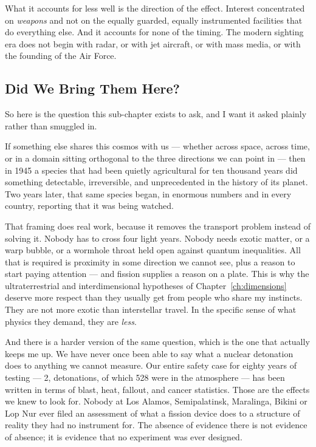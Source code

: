 What it accounts for less well is the direction of the effect. Interest concentrated on \emph{weapons}
and not on the equally guarded, equally instrumented facilities that do everything else. And it
accounts for none of the timing. The modern sighting era does not begin with radar, or with jet
aircraft, or with mass media, or with the founding of the Air Force. 

\subsection{Did We Bring Them Here?}\label{sub:didwebringthem}

So here is the question this sub-chapter exists to ask, and I want it asked plainly rather than
smuggled in.

If something else shares this cosmos with us --- whether across space, across time, or in a domain
sitting orthogonal to the three directions we can point in --- then in 1945 a species that had been
quietly agricultural for ten thousand years did something detectable, irreversible, and
unprecedented in the history of its planet. Two years later, that same species began, in enormous
numbers and in every country, reporting that it was being watched.


That framing does real work, because it removes the transport problem instead of solving it. Nobody
has to cross four light years. Nobody needs exotic matter, or a warp bubble, or a wormhole throat
held open against quantum inequalities. All that is required is proximity in some direction we
cannot see, plus a reason to start paying attention --- and fission supplies a reason on a plate.
This is why the ultraterrestrial and interdimensional hypotheses of
Chapter~\ref{ch:dimensions} deserve more respect than they usually get from people who share my
instincts. They are not more exotic than interstellar travel. In the specific sense of what physics
they demand, they are \emph{less}.

And there is a harder version of the same question, which is the one that actually keeps me up. We
have never once been able to say what a nuclear detonation does to anything we cannot measure. Our
entire safety case for eighty years of testing --- 2, detonations, of which 528 were in the
atmosphere --- has been written in terms of blast, heat, fallout, and cancer statistics. Those are the
effects we knew to look for. Nobody at Los Alamos, Semipalatinsk, Maralinga, Bikini or Lop Nur ever
filed an assessment of what a fission device does to a structure of reality they had no instrument
for.  The
absence of evidence there is not evidence of absence; it is evidence that no experiment was ever
designed.


